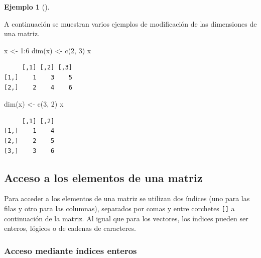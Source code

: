 \documentclass[
  a4paper,
]{scrreport}
\newenvironment{Shaded}{\begin{snugshade}}{\end{snugshade}}
\newcommand{\DecValTok}[1]{\textcolor[rgb]{0.68,0.00,0.00}{#1}}
\newcommand{\FunctionTok}[1]{\textcolor[rgb]{0.28,0.35,0.67}{#1}}
\newcommand{\NormalTok}[1]{\textcolor[rgb]{0.00,0.23,0.31}{#1}}
\newcommand{\OtherTok}[1]{\textcolor[rgb]{0.00,0.23,0.31}{#1}}
\newcommand{\SpecialCharTok}[1]{\textcolor[rgb]{0.37,0.37,0.37}{#1}}
\theoremstyle{definition}
\theoremstyle{definition}
\newtheorem{example}{Ejemplo}[chapter]
\theoremstyle{remark}
\begin{document}
\leavevmode{}%
\begin{example}[]\label{exm-modificacion-dimensiones-matriz}

A continuación se muestran varios ejemplos de modificación de las
dimensiones de una matriz.

\begin{Shaded}
\begin{Highlighting}[]
\NormalTok{x }\OtherTok{\textless{}{-}} \DecValTok{1}\SpecialCharTok{:}\DecValTok{6}
\FunctionTok{dim}\NormalTok{(x) }\OtherTok{\textless{}{-}} \FunctionTok{c}\NormalTok{(}\DecValTok{2}\NormalTok{, }\DecValTok{3}\NormalTok{)}
\NormalTok{x}
\end{Highlighting}
\end{Shaded}

\begin{verbatim}
     [,1] [,2] [,3]
[1,]    1    3    5
[2,]    2    4    6
\end{verbatim}

\begin{Shaded}
\begin{Highlighting}[]
\FunctionTok{dim}\NormalTok{(x) }\OtherTok{\textless{}{-}} \FunctionTok{c}\NormalTok{(}\DecValTok{3}\NormalTok{, }\DecValTok{2}\NormalTok{)}
\NormalTok{x}
\end{Highlighting}
\end{Shaded}

\begin{verbatim}
     [,1] [,2]
[1,]    1    4
[2,]    2    5
[3,]    3    6
\end{verbatim}

\end{example}

\hypertarget{acceso-a-los-elementos-de-una-matriz}{%
\subsection{Acceso a los elementos de una
matriz}\label{acceso-a-los-elementos-de-una-matriz}}

Para acceder a los elementos de una matriz se utilizan dos índices (uno
para las filas y otro para las columnas), separados por comas y entre
corchetes \texttt{{[}{]}} a continuación de la matriz. Al igual que para
los vectores, los índices pueden ser enteros, lógicos o de cadenas de
caracteres.

\hypertarget{acceso-mediante-uxedndices-enteros}{%
\subsubsection{Acceso mediante índices
enteros}\label{acceso-mediante-uxedndices-enteros}}
\end{document}
